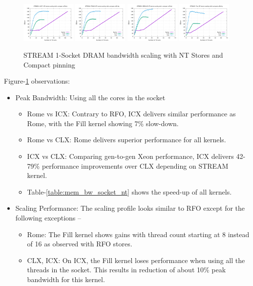 \documentclass{article}
\begin{document}
\begin{figure}[!ht]
    \centering
    \includegraphics[width=0.24\textwidth]{../mem_bw_scale/mb_scale_compact_Copy_nt}
    \includegraphics[width=0.24\textwidth]{../mem_bw_scale/mb_scale_compact_Triad_nt}
    \includegraphics[width=0.24\textwidth]{../mem_bw_scale/mb_scale_compact_Reduce_nt}
    \includegraphics[width=0.24\textwidth]{../mem_bw_scale/mb_scale_compact_Fill_nt}
    \caption{STREAM 1-Socket DRAM bandwidth scaling with NT Stores and Compact pinning}
    \label{figure:mem_bw_scale_compact_nt}
\end{figure}

Figure-\ref{figure:mem_bw_scale_compact_nt} observations:
\begin{itemize}
\item Peak Bandwidth: Using all the cores in the socket
\begin{itemize}
\item Rome vs ICX: Contrary to RFO, ICX delivers similar performance as Rome, with the Fill kernel showing 7\% slow-down.
\item Rome vs CLX: Rome delivers superior performance for all kernels.
\item ICX vs CLX: Comparing gen-to-gen Xeon performance, ICX delivers 42-79\% performance improvements over CLX depending on STREAM kernel.
\item Table-\ref{table:mem_bw_socket_nt} shows the speed-up of all kernels.
\end{itemize}
\item Scaling Performance: The scaling profile looks similar to RFO except for the following exceptions --
\begin{itemize}
\item Rome: The Fill kernel shows gains with thread count starting at 8 instead of 16 as observed with RFO stores.
\item CLX, ICX: On ICX, the Fill kernel loses performance when using all the threads in the socket. This results in reduction of about 10\% peak bandwidth for this kernel.
\end{itemize}
\end{itemize}
\end{document}
